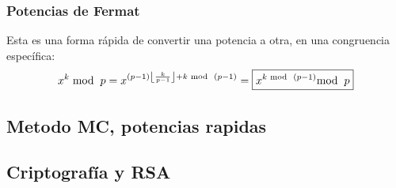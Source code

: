 \subsubsection{Potencias de Fermat}
\noindent Esta es una forma rápida de convertir una potencia a otra, en una congruencia específica:
\[
        x^k\hspace{1mm}\textnormal{mod}\hspace{2mm}p = x^{(p-1)\left \lfloor \frac{k}{p-1} \right \rfloor + k\hspace{1mm}\textnormal{mod}\hspace{2mm}(p-1)}=\boxed{x^{k\hspace{1mm}\textnormal{mod}\hspace{2mm}(p-1)}\textnormal{mod}\hspace{2mm}p}
\]
\subsection{Metodo MC, potencias rapidas}
\subsection{Criptografía y RSA}
